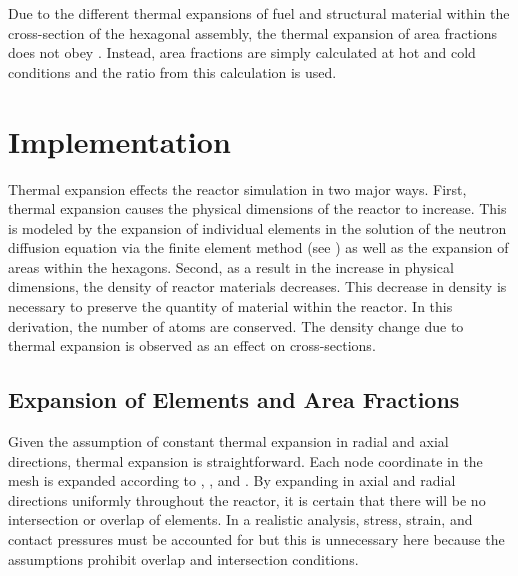   Due to the different thermal expansions of fuel and structural material within
  the cross-section of the hexagonal assembly, the thermal expansion of area 
  fractions does not obey . Instead, area fractions
  are simply calculated at hot and cold conditions and the ratio from this
  calculation is used.

\section{Implementation}
  Thermal expansion effects the reactor simulation in two major ways. First,
  thermal expansion causes the physical dimensions of the reactor to increase. 
  This is modeled by the expansion of individual elements in the solution of the
  neutron diffusion equation via the finite element method (see
  ) as well as the expansion of areas within the 
  hexagons.  Second, as a result in the increase in physical dimensions, the 
  density of reactor materials decreases. This decrease in density is necessary
  to preserve the quantity of material within the reactor. In this derivation,
  the number of atoms are conserved. The density change due to thermal expansion 
  is observed as an effect on cross-sections.

  \subsection{Expansion of Elements and Area Fractions}
    Given the assumption of constant thermal expansion in radial and axial
    directions, thermal expansion is straightforward. Each node coordinate in
    the mesh is expanded according to , ,
    and . By expanding in axial and radial directions
    uniformly throughout the reactor, it is certain that there will be no
    intersection or overlap of elements. In a realistic analysis, stress,
    strain, and contact pressures must be accounted for but this is unnecessary
    here because the assumptions prohibit overlap and intersection conditions.

